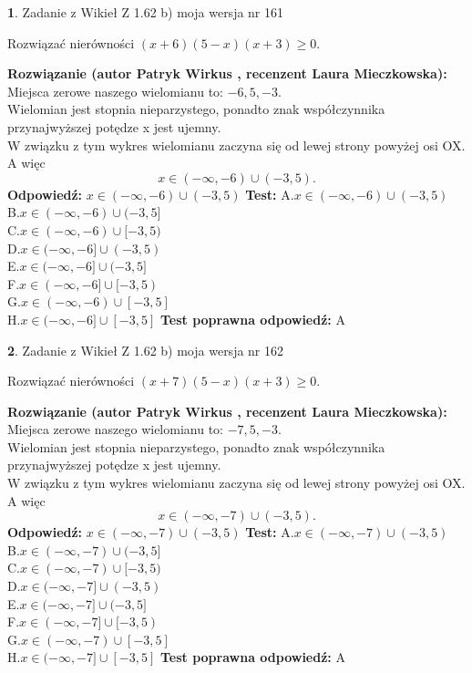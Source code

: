 \documentclass[12pt, a4paper]{article}
\theoremstyle{definition} %
\newtheorem{zad}{}
\newcommand{\zadStart}[1]{\begin{zad}#1\newline}
\newcommand{\zadStop}{\end{zad}}
\newcommand{\rozwStart}[2]{\noindent \textbf{Rozwiązanie (autor #1 , recenzent #2): }\newline}
\newcommand{\rozwStop}{\newline}
\newcommand{\odpStart}{\noindent \textbf{Odpowiedź:}\newline}
\newcommand{\odpStop}{\newline}
\newcommand{\testStart}{\noindent \textbf{Test:}\newline}
\newcommand{\testStop}{\newline}
\newcommand{\kluczStart}{\noindent \textbf{Test poprawna odpowiedź:}\newline}
\newcommand{\kluczStop}{\newline}
\begin{document}
\zadStart{Zadanie z Wikieł Z 1.62 b) moja wersja nr 161}

Rozwiązać nierówności $(x+6)(5-x)(x+3)\ge0$.
\zadStop
\rozwStart{Patryk Wirkus}{Laura Mieczkowska}
Miejsca zerowe naszego wielomianu to: $-6, 5, -3$.\\
Wielomian jest stopnia nieparzystego, ponadto znak współczynnika przy\linebreak najwyższej potędze x jest ujemny.\\ W związku z tym wykres wielomianu zaczyna się od lewej strony powyżej osi OX. A więc $$x \in (-\infty,-6) \cup (-3,5).$$
\rozwStop
\odpStart
$x \in (-\infty,-6) \cup (-3,5)$
\odpStop
\testStart
A.$x \in (-\infty,-6) \cup (-3,5)$\\
B.$x \in (-\infty,-6) \cup (-3,5]$\\
C.$x \in (-\infty,-6) \cup [-3,5)$\\
D.$x \in (-\infty,-6] \cup (-3,5)$\\
E.$x \in (-\infty,-6] \cup (-3,5]$\\
F.$x \in (-\infty,-6] \cup [-3,5)$\\
G.$x \in (-\infty,-6) \cup [-3,5]$\\
H.$x \in (-\infty,-6] \cup [-3,5]$
\testStop
\kluczStart
A
\kluczStop



\zadStart{Zadanie z Wikieł Z 1.62 b) moja wersja nr 162}

Rozwiązać nierówności $(x+7)(5-x)(x+3)\ge0$.
\zadStop
\rozwStart{Patryk Wirkus}{Laura Mieczkowska}
Miejsca zerowe naszego wielomianu to: $-7, 5, -3$.\\
Wielomian jest stopnia nieparzystego, ponadto znak współczynnika przy\linebreak najwyższej potędze x jest ujemny.\\ W związku z tym wykres wielomianu zaczyna się od lewej strony powyżej osi OX. A więc $$x \in (-\infty,-7) \cup (-3,5).$$
\rozwStop
\odpStart
$x \in (-\infty,-7) \cup (-3,5)$
\odpStop
\testStart
A.$x \in (-\infty,-7) \cup (-3,5)$\\
B.$x \in (-\infty,-7) \cup (-3,5]$\\
C.$x \in (-\infty,-7) \cup [-3,5)$\\
D.$x \in (-\infty,-7] \cup (-3,5)$\\
E.$x \in (-\infty,-7] \cup (-3,5]$\\
F.$x \in (-\infty,-7] \cup [-3,5)$\\
G.$x \in (-\infty,-7) \cup [-3,5]$\\
H.$x \in (-\infty,-7] \cup [-3,5]$
\testStop
\kluczStart
A
\kluczStop
\end{document}
